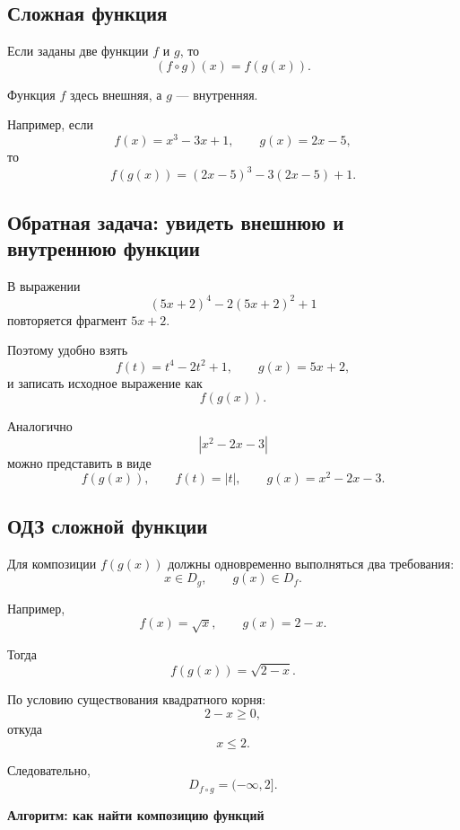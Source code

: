 \documentclass[a4paper,12pt]{article}
\newcommand{\subsect}[1]{\subsection*{\textcolor{accent}{#1}}}
\begin{document}
\subsect{Сложная функция}

Если заданы две функции $f$ и $g$, то
\[
(f\circ g)(x)=f(g(x)).
\]

Функция $f$ здесь внешняя, а $g$ --- внутренняя.

Например, если
\[
f(x)=x^3-3x+1,
\qquad
g(x)=2x-5,
\]
то
\[
f(g(x))=(2x-5)^3-3(2x-5)+1.
\]

\subsect{Обратная задача: увидеть внешнюю и внутреннюю функции}

В выражении
\[
(5x+2)^4-2(5x+2)^2+1
\]
повторяется фрагмент $5x+2$.

Поэтому удобно взять
\[
f(t)=t^4-2t^2+1,
\qquad
g(x)=5x+2,
\]
и записать исходное выражение как
\[
f(g(x)).
\]

Аналогично
\[
\left|x^2-2x-3\right|
\]
можно представить в виде
\[
f(g(x)),
\qquad
f(t)=|t|,
\qquad
g(x)=x^2-2x-3.
\]

\subsect{ОДЗ сложной функции}

Для композиции $f(g(x))$ должны одновременно выполняться два требования:
\[
x\in D_g,
\qquad
g(x)\in D_f.
\]

Например,
\[
f(x)=\sqrt{x},
\qquad
g(x)=2-x.
\]

Тогда
\[
f(g(x))=\sqrt{2-x}.
\]

По условию существования квадратного корня:
\[
2-x\ge0,
\]
откуда
\[
x\le2.
\]

Следовательно,
\[
D_{f\circ g}=(-\infty,2].
\]

\clearpage
\thispagestyle{fancy}

\begin{center}
{\Large\textcolor{darkaccent}{
\textbf{Алгоритм: как найти композицию функций}
}}
\end{center}

\vspace{8mm}

\begin{center}
\end{center}
\end{document}
